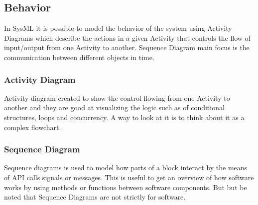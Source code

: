 \subsection{Behavior}\label{sc:behavior}
In SysML it is possible to model the behavior of the system using Activity Diagrams which describe the actions in a given Activity that controls the flow of input/output from one Activity to another. Sequence Diagram main focus is the communication between different objects in time. 

\subsubsection{Activity Diagram}\label{ssc:activitydiagram}
Activity diagram created to show the control flowing from one Activity to another and they are good at visualizing the logic such as of conditional structures, loops and concurrency. A way to look at it is to think about it as a complex flowchart.

\subsubsection{Sequence Diagram}\label{ssc:sequencediagram}
Sequence diagrams is used to model how parts of a block interact by the means of API calls signals or messages. This is useful to get an overview of how software works by using methods or functions between software components. But but be noted that Sequence Diagrams are not strictly for software.  